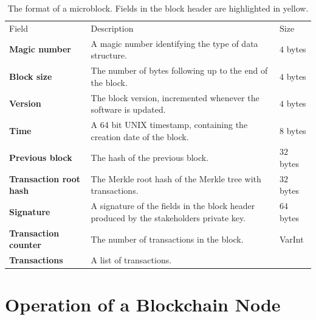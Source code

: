 \documentclass{style/kththesis}
\begin{document}
\begin{appendices}
\begin{longtabu}{lXl}
\caption{The format of a microblock. Fields in the block header are highlighted in yellow.} \\
\cmidrule(r){1-3}
Field & Description & Size \\ 
\cmidrule(r){1-3}
\textbf{Magic number} & A magic number identifying the type of data structure. & $4$ bytes \\
\textbf{Block size} & The number of bytes following up to the end of the block. & $4$ bytes \\
 \textbf{Version} & The block version, incremented whenever the software is updated. & $4$ bytes \\
 \textbf{Time} & A 64 bit UNIX timestamp, containing the creation date of the block. & $8$ bytes \\
 \textbf{Previous block} & The hash of the previous block. & $32$ bytes \\
 \textbf{Transaction root hash} & The Merkle root hash of the Merkle tree with transactions. & $32$ bytes \\
 \textbf{Signature} & A signature of the fields in the block header produced by the stakeholders private key. & $64$ bytes \\
\textbf{Transaction counter} & The number of transactions in the block. & VarInt \\
\textbf{Transactions} & A list of transactions. & 
\end{longtabu}

\chapter{Operation of a Blockchain Node}
\label{app:blockchain-operation}

\end{appendices}
\end{document}
